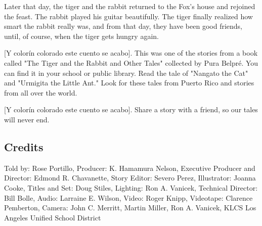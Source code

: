 Later that day, the tiger and the rabbit returned to the Fox's house and rejoined the feast. The rabbit played his guitar beautifully. The tiger finally realized how smart the rabbit really was, and from that day, they have been good friends, until, of course, when the tiger gets hungry again.

    [Y colorín colorado este cuento se acabo]. This was one of the stories from a book called "The Tiger and the Rabbit and Other Tales" collected by Pura Belpré. You can find it in your school or public library. Read the tale of "Nangato the Cat" and "Urmigita the Little Ant." Look for these tales from Puerto Rico and stories from all over the world.

    [Y colorín colorado este cuento se acabo]. Share a story with a friend, so our tales will never end.

\subsection{Credits}

Told by: Rose Portillo,
Producer: K. Hamamura Nelson,
Executive Producer and Director: Edmond R. Chavanette,
Story Editor: Severo Perez,
Illustrator: Joanna Cooke,
Titles and Set: Doug Stiles,
Lighting: Ron A. Vanicek,
Technical Director: Bill Bolle,
Audio: Larraine E. Wilson,
Video: Roger Knipp,
Videotape: Clarence Pemberton,
Camera: John C. Merritt, Martin Miller, Ron A. Vanicek,
KLCS Los Angeles Unified School District